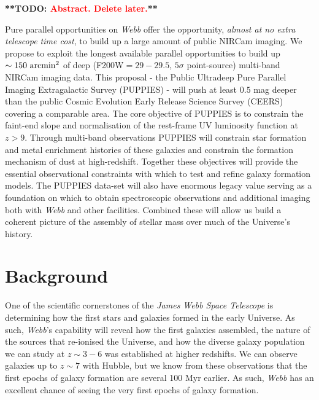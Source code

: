\documentclass[12pt]{article}
\newcommand{\todo}[1]{\textbf{**TODO: \textcolor{red}{#1}**}}
\begin{document}
%
%

\todo{Abstract. Delete later.}

Pure parallel opportunities on \emph{Webb} offer the opportunity, \emph{almost at no extra telescope time cost}, to build up a large amount of public NIRCam imaging. We propose to exploit the longest available parallel opportunities to build up $\sim 150\ {\rm arcmin^2}$ of deep (F200W$=29-29.5$, $5\sigma$ point-source) multi-band NIRCam imaging data. This proposal - the Public Ultradeep Pure Parallel Imaging Extragalactic Survey (PUPPIES) - will push at least $0.5$ mag deeper than the public Cosmic Evolution Early Release Science Survey (CEERS) covering a comparable area. The core objective of PUPPIES is to constrain the faint-end slope and normalisation of the rest-frame UV luminosity function at $z>9$. Through  multi-band observations PUPPIES will constrain star formation and metal enrichment histories of these galaxies and constrain the formation mechanism of dust at high-redshift. Together these objectives will provide the essential observational constraints with  which to test and refine galaxy formation models. The PUPPIES data-set will also have enormous legacy value serving as a foundation on which to obtain spectroscopic observations and additional imaging both with \emph{Webb} and other facilities. Combined these will allow us build a coherent picture of the assembly of stellar mass over much of the Universe's history. 


\clearpage

\justification          %

\section{Background}

One of the scientific cornerstones of the \emph{James Webb Space Telescope} is determining how the first stars and galaxies formed in the early Universe. As such, \emph{Webb}'s capability will reveal how the first galaxies assembled, the nature of the sources that re-ionised the Universe, and how the diverse galaxy population we can study at $z \sim 3-6$ was established at higher redshifts.  We can observe galaxies up to $z \sim 7$ with Hubble, but we know from these observations that the first epochs of galaxy formation are several 100 Myr earlier.  As such, \emph{Webb} has an excellent chance of seeing the very first epochs of galaxy formation.
\end{document}
